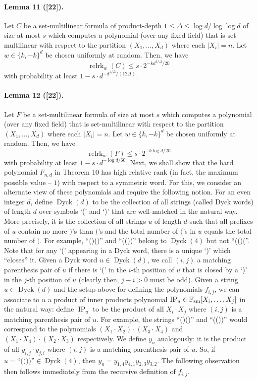 \documentclass[10pt,a4paper]{article}
\begin{document}
\paragraph{Lemma 11 ([22]).} Let $C$ be a set-multilinear formula of product-depth $1\leq\Delta\leq\log d/\log\log d$ of size at most $s$ which computes a polynomial (over any fixed field) that is set-multilinear with respect to the partition $(X_1,\ldots,X_d)$ where each $|X_i|=n$. Let $w\in\{k,-k\}^d$ be chosen uniformly at random. Then, we have
\[\operatorname{relrk}_w(C)\leq s\cdot2^{-kd^{1/\Delta}/20}\]
with probability at least $1-s\cdot d^{-d^{1/\Delta}/(12\Delta)}$.
\paragraph{Lemma 12 ([22]).} Let $F$ be a set-multilinear formula of size at most $s$ which computes a polynomial (over any fixed field) that is set-multilinear with respect to the partition $(X_1,\ldots,X_d)$ where each $|X_i|=n$. Let $w\in\{k,-k\}^d$ be chosen uniformly at random. Then, we have
\[\operatorname{relrk}_w(F)\leq s\cdot2^{-k\log d/20}\]
with probability at least $1-s\cdot d^{-\log d/60}$.
Next, we shall show that the hard polynomial $F_{n,d}$ in Theorem 10 has high relative rank (in fact, the maximum possible value -- $1$) with respect to a symmetric word. For this, we consider an alternate view of these polynomials and require the following notion. For an even integer $d$, define $\operatorname{Dyck}(d)$ to be the collection of all strings (called Dyck words) of length $d$ over symbols `(' and `)' that are well-matched in the natural way. More precisely, it is the collection of all strings $u$ of length $d$ such that all prefixes of $u$ contain no more $)$'s than $($'s and the total number of $($'s in $u$ equals the total number of $)$. For example, ``()()'' and ``(())'' belong to $\operatorname{Dyck}(4)$ but not ``(()(''. Note that for any `(' appearing in a Dyck word, there is a unique `)' which ``closes'' it. Given a Dyck word $u\in\operatorname{Dyck}(d)$, we call $(i,j)$ a matching parenthesis pair of $u$ if there is `(' in the $i$-th position of $u$ that is closed by a `)' in the $j$-th position of $u$ (clearly then, $j-i>0$ must be odd).
Given a string $u\in\operatorname{Dyck}(d)$ and the setup above for defining the polynomials $f_{i,j}$, we can associate to $u$ a product of inner products polynomial $\operatorname{IP}_u\in\mathbb F_{\rm sm}[X_i,\ldots,X_j]$ in the natural way: define $\operatorname{IP}_u$ to be the product of all $X_i\cdot X_j$ where $(i,j)$ is a matching parenthesis pair of $u$. For example, the strings ``()()'' and ``(())'' would correspond to the polynomials $(X_1\cdot X_2)\cdot(X_3\cdot X_4)$ and $(X_1\cdot X_4)\cdot(X_2\cdot X_3)$ respectively. We define $y_u$ analogously: it is the product of all $y_{i,j}\cdot y_{j,i}$ where $(i,j)$ is a matching parenthesis pair of $u$. So, if $u=\text{``(())''}\in\operatorname{Dyck}(4)$, then $y_u=y_{1,4}y_{4,1}y_{2,3}y_{3,2}$. The following observation then follows immediately from the recursive definition of $f_{i,j}$.
\end{document}
